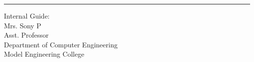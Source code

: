 \documentclass[10pt]{article}
\begin{document}
\hrule
\vspace{.2in}
\begin{flushleft}
Internal Guide:
\vspace{.3in}
\\Mrs. Sony P
\\Asst. Professor
\\Department of Computer Engineering 
\\Model Engineering College 
\end{flushleft}
\end{document}
